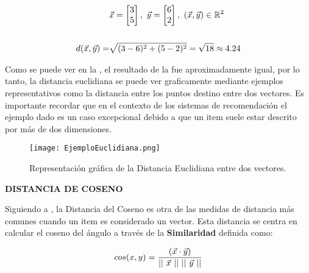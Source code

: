     \begin{equation}
        \begin{split}
            &\vec{x} = \begin{bmatrix}
                3
                \\
                5
            \end{bmatrix}, \ 
            \vec{y} = \begin{bmatrix}
                6
                \\
                2
            \end{bmatrix}, \
            (\vec{x}, \vec{y}) \in \mathbb{R}^2
            \\
            \\
            d(\vec{x}, \vec{y}) = &\sqrt{(3 - 6)^2 + (5 - 2)^2} = \sqrt{18} \approx 4.24
        \end{split}
        \addequation{Ejemplo de Distancia Euclidiana}
        \label{EjemploDistanciaEuclidiana}
    \end{equation}

    Como se puede ver en la , el resultado de la  fue aproximadamente igual, por lo tanto, la distancia euclidiana se puede ver graficamente mediante ejemplos representativos como la distancia entre los puntos destino entre dos vectores. Es importante recordar que en el contexto de los sistemas de recomendación el ejemplo dado es un caso excepcional debido a que un item suele estar descrito por más de dos dimensiones.

    \newpage

    \begin{figure}[h!]
        \centering
        \texttt{[image: EjemploEuclidiana.png]}
        \caption{Representación gráfica de la Distancia Euclidiana entre dos vectores.}
        \label{fig: EjemploEuclidiana}
    \end{figure}

    \textbf{DISTANCIA DE COSENO}

    Siguiendo a \parencite{10.5555/1941884}, la Distancia del Coseno es otra de las medidas de distancia más comunes cuando un item es considerado un vector. Esta distancia se centra en calcular el coseno del ángulo a través de la \textbf{Similaridad} definida como: 
    
    \begin{equation}
        cos(x, y) = \frac{(\vec{x} \cdot \vec{y})}{|| \ \vec{x} \ || \ || \ \vec{y} \ || }
        \addequation{Definición de la Similaridad de Coseno}
        \label{SimilaridadCoseno}
    \end{equation}

